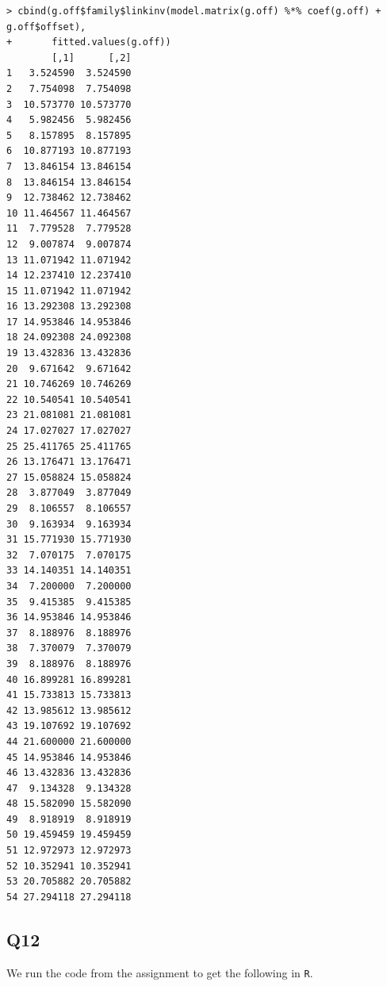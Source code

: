 \documentclass[11pt]{article}
\begin{document}
\begin{verbatim}
> cbind(g.off$family$linkinv(model.matrix(g.off) %*% coef(g.off) + g.off$offset),
+       fitted.values(g.off))
        [,1]      [,2]
1   3.524590  3.524590
2   7.754098  7.754098
3  10.573770 10.573770
4   5.982456  5.982456
5   8.157895  8.157895
6  10.877193 10.877193
7  13.846154 13.846154
8  13.846154 13.846154
9  12.738462 12.738462
10 11.464567 11.464567
11  7.779528  7.779528
12  9.007874  9.007874
13 11.071942 11.071942
14 12.237410 12.237410
15 11.071942 11.071942
16 13.292308 13.292308
17 14.953846 14.953846
18 24.092308 24.092308
19 13.432836 13.432836
20  9.671642  9.671642
21 10.746269 10.746269
22 10.540541 10.540541
23 21.081081 21.081081
24 17.027027 17.027027
25 25.411765 25.411765
26 13.176471 13.176471
27 15.058824 15.058824
28  3.877049  3.877049
29  8.106557  8.106557
30  9.163934  9.163934
31 15.771930 15.771930
32  7.070175  7.070175
33 14.140351 14.140351
34  7.200000  7.200000
35  9.415385  9.415385
36 14.953846 14.953846
37  8.188976  8.188976
38  7.370079  7.370079
39  8.188976  8.188976
40 16.899281 16.899281
41 15.733813 15.733813
42 13.985612 13.985612
43 19.107692 19.107692
44 21.600000 21.600000
45 14.953846 14.953846
46 13.432836 13.432836
47  9.134328  9.134328
48 15.582090 15.582090
49  8.918919  8.918919
50 19.459459 19.459459
51 12.972973 12.972973
52 10.352941 10.352941
53 20.705882 20.705882
54 27.294118 27.294118
\end{verbatim}

\subsection*{Q12}

We run the code from the assignment to get the following in \verb|R|.
\end{document}
